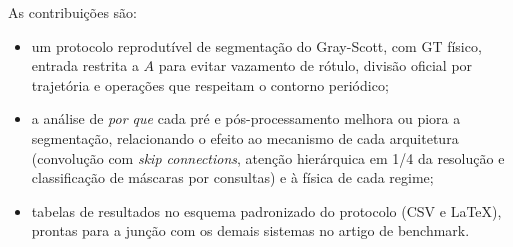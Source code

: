 As contribuições são:
\begin{itemize}
  \item um protocolo reprodutível de segmentação do Gray-Scott, com GT físico, entrada restrita a
    $A$ para evitar vazamento de rótulo, divisão oficial por trajetória e operações que respeitam o
    contorno periódico;
  \item a análise de \emph{por que} cada pré e pós-processamento melhora ou piora a segmentação,
    relacionando o efeito ao mecanismo de cada arquitetura (convolução com \emph{skip connections},
    atenção hierárquica em 1/4 da resolução e classificação de máscaras por consultas) e à física
    de cada regime;
  \item tabelas de resultados no esquema padronizado do protocolo (CSV e \LaTeX), prontas para a
    junção com os demais sistemas no artigo de benchmark.
\end{itemize}
